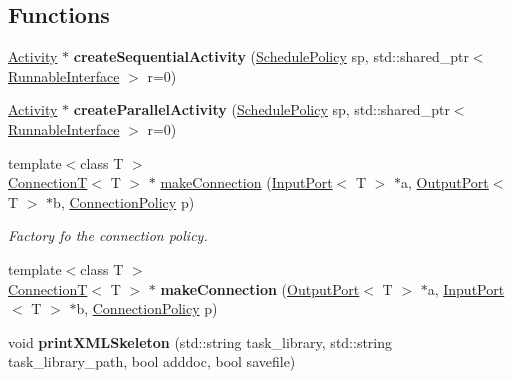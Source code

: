 \subsection*{Functions}
\begin{DoxyCompactItemize}
\item 
\hypertarget{namespacecoco_a42f5b31ac6886c63c9dfc27cccb4b2a1}{}\hyperlink{classcoco_1_1_activity}{Activity} $\ast$ {\bfseries create\+Sequential\+Activity} (\hyperlink{structcoco_1_1_schedule_policy}{Schedule\+Policy} sp, std\+::shared\+\_\+ptr$<$ \hyperlink{classcoco_1_1_runnable_interface}{Runnable\+Interface} $>$ r=0)\label{namespacecoco_a42f5b31ac6886c63c9dfc27cccb4b2a1}

\item 
\hypertarget{namespacecoco_a9149c0ad2cb2e734ba6309847ed07774}{}\hyperlink{classcoco_1_1_activity}{Activity} $\ast$ {\bfseries create\+Parallel\+Activity} (\hyperlink{structcoco_1_1_schedule_policy}{Schedule\+Policy} sp, std\+::shared\+\_\+ptr$<$ \hyperlink{classcoco_1_1_runnable_interface}{Runnable\+Interface} $>$ r=0)\label{namespacecoco_a9149c0ad2cb2e734ba6309847ed07774}

\item 
\hypertarget{namespacecoco_ab29d1b461cebed45dc5a94fb6bdecb10}{}{\footnotesize template$<$class T $>$ }\\\hyperlink{classcoco_1_1_connection_t}{Connection\+T}$<$ T $>$ $\ast$ \hyperlink{namespacecoco_ab29d1b461cebed45dc5a94fb6bdecb10}{make\+Connection} (\hyperlink{classcoco_1_1_input_port}{Input\+Port}$<$ T $>$ $\ast$a, \hyperlink{classcoco_1_1_output_port}{Output\+Port}$<$ T $>$ $\ast$b, \hyperlink{structcoco_1_1_connection_policy}{Connection\+Policy} p)\label{namespacecoco_ab29d1b461cebed45dc5a94fb6bdecb10}

\begin{DoxyCompactList}\small\item\em Factory fo the connection policy. \end{DoxyCompactList}\item 
\hypertarget{namespacecoco_a4b426843dbddcc8796fb8ee82af2f723}{}{\footnotesize template$<$class T $>$ }\\\hyperlink{classcoco_1_1_connection_t}{Connection\+T}$<$ T $>$ $\ast$ {\bfseries make\+Connection} (\hyperlink{classcoco_1_1_output_port}{Output\+Port}$<$ T $>$ $\ast$a, \hyperlink{classcoco_1_1_input_port}{Input\+Port}$<$ T $>$ $\ast$b, \hyperlink{structcoco_1_1_connection_policy}{Connection\+Policy} p)\label{namespacecoco_a4b426843dbddcc8796fb8ee82af2f723}

\item 
\hypertarget{namespacecoco_a6b00babdb26f6e8da987cc56c8cecb30}{}void {\bfseries print\+X\+M\+L\+Skeleton} (std\+::string task\+\_\+library, std\+::string task\+\_\+library\+\_\+path, bool adddoc, bool savefile)\label{namespacecoco_a6b00babdb26f6e8da987cc56c8cecb30}

\end{DoxyCompactItemize}



